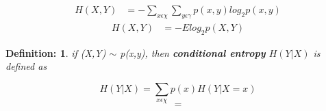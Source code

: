 \documentclass[11pt]{article}
\newtheorem{defn}{Definition:}
\begin{document}
\begin{equation}
\begin{aligned}
H(X,Y) &= - \sum \limits_{x \epsilon \chi} \sum \limits_{y \epsilon \gamma} p(x,y)log_{2} p(x,y)
\end{aligned}
\end{equation}
\begin{equation}
\begin{aligned}
H(X,Y)&=-Elog_{2}p(X,Y)
\end{aligned}
\end{equation}

\begin{defn}
if (X,Y) $\sim$ p(x,y), then \textbf{conditional entropy} $H(Y|X)$ is defined as
\end{defn}

\begin{equation}
H(Y|X)=\sum \limits_{x \epsilon \chi} p(x) H(Y|X=x)
\end{equation}
\begin{equation}
=
\end{equation}
\end{document}
